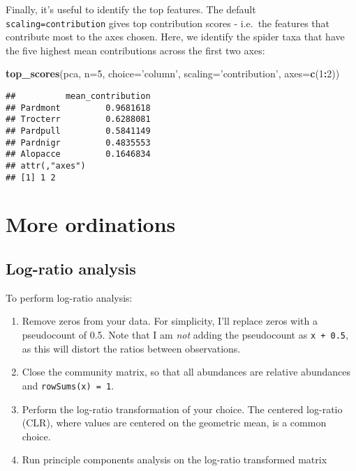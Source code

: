\documentclass[
]{article}
\newenvironment{Shaded}{\begin{snugshade}}{\end{snugshade}}
\newcommand{\DataTypeTok}[1]{\textcolor[rgb]{0.13,0.29,0.53}{#1}}
\newcommand{\DecValTok}[1]{\textcolor[rgb]{0.00,0.00,0.81}{#1}}
\newcommand{\KeywordTok}[1]{\textcolor[rgb]{0.13,0.29,0.53}{\textbf{#1}}}
\newcommand{\NormalTok}[1]{#1}
\newcommand{\OperatorTok}[1]{\textcolor[rgb]{0.81,0.36,0.00}{\textbf{#1}}}
\newcommand{\StringTok}[1]{\textcolor[rgb]{0.31,0.60,0.02}{#1}}
\providecommand{\tightlist}{%
  \setlength{\itemsep}{0pt}\setlength{\parskip}{0pt}}
\begin{document}
Finally, it's useful to identify the top features. The default
\texttt{scaling=\textquotesingle{}contribution\textquotesingle{}} gives
top contribution scores - i.e.~the features that contribute most to the
axes chosen. Here, we identify the spider taxa that have the five
highest mean contributions across the first two axes:

\begin{Shaded}
\begin{Highlighting}[]
\KeywordTok{top_scores}\NormalTok{(pca, }\DataTypeTok{n=}\DecValTok{5}\NormalTok{, }\DataTypeTok{choice=}\StringTok{'column'}\NormalTok{, }\DataTypeTok{scaling=}\StringTok{'contribution'}\NormalTok{, }\DataTypeTok{axes=}\KeywordTok{c}\NormalTok{(}\DecValTok{1}\OperatorTok{:}\DecValTok{2}\NormalTok{))}
\end{Highlighting}
\end{Shaded}

\begin{verbatim}
##          mean_contribution
## Pardmont         0.9681618
## Trocterr         0.6288081
## Pardpull         0.5841149
## Pardnigr         0.4835553
## Alopacce         0.1646834
## attr(,"axes")
## [1] 1 2
\end{verbatim}

\hypertarget{more-ordinations}{%
\section{More ordinations}\label{more-ordinations}}

\hypertarget{log-ratio-analysis}{%
\subsection{Log-ratio analysis}\label{log-ratio-analysis}}

To perform log-ratio analysis:

\begin{enumerate}
\def\labelenumi{\arabic{enumi}.}
\tightlist
\item
  Remove zeros from your data. For simplicity, I'll replace zeros with a
  pseudocount of 0.5. Note that I am \emph{not} adding the pseudocount
  as \texttt{x\ +\ 0.5}, as this will distort the ratios between
  observations.
\item
  Close the community matrix, so that all abundances are relative
  abundances and \texttt{rowSums(x)\ =\ 1}.
\item
  Perform the log-ratio transformation of your choice. The centered
  log-ratio (CLR), where values are centered on the geometric mean, is a
  common choice.
\item
  Run principle components analysis on the log-ratio transformed matrix
\end{enumerate}
\end{document}
